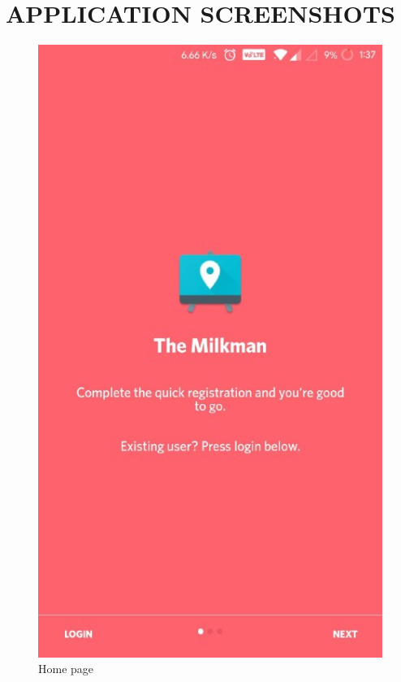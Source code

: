 \section{\uppercase{Application Screenshots}}
\begin{figure}[h]
\begin{center}
\includegraphics[scale=0.6]{3/one.jpeg}
\caption{Home page}
\label{fig:one}
\end{center}
\end{figure}


